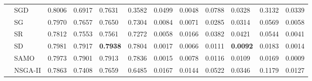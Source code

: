 \begin{table*}[!htb]
\begin{tabular}{|l|l|l|l|l|l|l|l|l|l|l|l|}
		& SGD                 & 0.8006         & 0.6917         & 0.7631           & 0.3582          & 0.0499            & 0.0048         & 0.0788         & 0.0328           & 0.3132          & 0.0339             \\ 
		& SG                  & 0.7970         & 0.7657         & 0.7650           & 0.7304          & 0.0084           & 0.0071         & 0.0285         & 0.0314           & 0.0569          & 0.0058          \\ 
		& SR                  & 0.7812         & 0.7553         & 0.7561           & 0.7272          & 0.0058           & 0.0166         & 0.0382         & 0.0421           & 0.0544          & 0.0041             \\ 
		& SD                  & 0.7981         & 0.7917         & \textbf{0.7938}           & 0.7804          & 0.0017& 0.0066         & 0.0111         & \textbf{0.0092}           & 0.0183          & 0.0014               \\ 
		& SAMO                & 0.7973         & 0.7901         & 0.7913           & 0.7836          & 0.0015   & 0.0078         & 0.0116         & 0.0109           & 0.0169          & 0.0009             \\ 
		& NSGA-II             & 0.7863         & 0.7408         & 0.7659           & 0.6485          & 0.0167      & 0.0144         & 0.0522         & 0.0346           & 0.1179          & 0.0127           \\ \hline
		

\end{tabular}
\end{table*}
